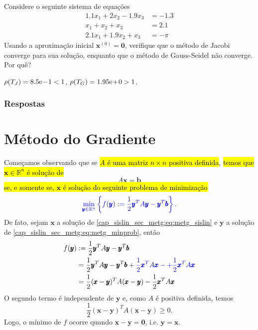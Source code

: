\begin{exer}
  Considere o seguinte sistema de equações
  \begin{equation}
    \begin{aligned}
      1.1x_1 + 2x_2 - 1.9x_3 &= -1.3\\
      x_1 + x_2 + x_3 &= 2.1\\
      2.1x_1 + 1.9x_2 + x_3 &= -\pi
    \end{aligned}
  \end{equation}
  Usando a aproximação inicial $\pmb{x}^{(0)} = \pmb{0}$, verifique que o método de Jacobi converge para sua solução, enquanto que o método de Gauss-Seidel não converge. Por quê?  
\end{exer}
\begin{resp}
  $\rho(T_J) = 8.5\mathrm{e}\!-\!1 < 1$, $\rho(T_G) = 1.95\mathrm{e}\!+\!0 > 1$.
\end{resp}

\ifisbook
\subsubsection{Respostas}
\shipoutAnswer
\fi


\section{Método do Gradiente}\label{cap_sislin_sec_metg}

Começamos observando que se \hl{$A$ é uma matriz $n\times n$ positiva definida}, \hl{temos que $\pmb{x}\in\mathbb{R}^n$ é solução de}
\begin{equation}\label{cap_sislin_sec_metg:eq:metg_sislin}
  A\pmb{x} = \pmb{b}
\end{equation}
\hl{se, e somente se, $\pmb{x}$ é solução do seguinte problema de minimização}
\begin{equation}\label{cap_sislin_sec_metg:eq:metg_minprob}\color{blue}\min_{\pmb{y}\in\mathbb{R}^n}\left\{f(\pmb{y}) := \frac{1}{2}\pmb{y}^TA\pmb{y}-\pmb{y}^T\pmb{b}\right\}.
\end{equation}
De fato, sejam $\pmb{x}$ a solução de \eqref{cap_sislin_sec_metg:eq:metg_sislin} e $\pmb{y}$ a solução de \eqref{cap_sislin_sec_metg:eq:metg_minprob}, então
\begin{align}
  f(\pmb{y}) &:= \frac{1}{2}\pmb{y}^TA\pmb{y}-\pmb{y}^T\pmb{b}\\
             &= \frac{1}{2}\pmb{y}^TA\pmb{y}-\pmb{y}^T\pmb{b} + {\color{blue}\frac{1}{2}\pmb{x}^TA\pmb{x} - + \frac{1}{2}\pmb{x}^TA\pmb{x}}\\
             &= \frac{1}{2}(\pmb{x}-\pmb{y})^TA(\pmb{x}-\pmb{y}) - \frac{1}{2}\pmb{x}^TA\pmb{x}
\end{align}
O segundo termo é independente de $\pmb{y}$ e, como $A$ é positiva definida, temos
\begin{equation}
  \frac{1}{2}(\pmb{x}-\pmb{y})^TA(\pmb{x}-\pmb{y}) \geq 0.
\end{equation}
Logo, o mínimo de $f$ ocorre quando $\pmb{x}-\pmb{y} = \pmb{0}$, i.e. $\pmb{y} = \pmb{x}$.


